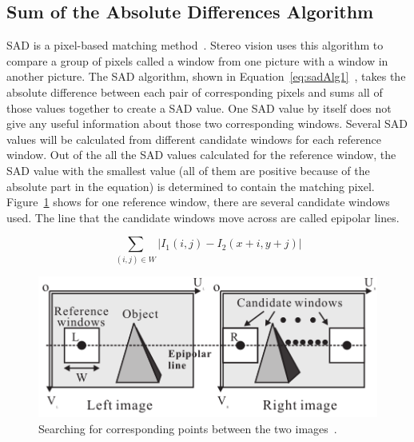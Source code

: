 \subsection{Sum of the Absolute Differences Algorithm}

SAD is a pixel-based matching method~\cite{alteraStratixIVPaper}. Stereo vision uses this algorithm to compare a group of pixels called a window from one picture with a window in another picture. The SAD algorithm, shown in Equation~\ref{eq:sadAlg1}~\cite{alteraStratixIVPaper}, takes the absolute difference between each pair of corresponding pixels and sums all of those values together to create a SAD value. One SAD value by itself does not give any useful information about those two corresponding windows. Several SAD values will be calculated from different candidate windows for each reference window. Out of the all the SAD values calculated for the reference window, the SAD value with the smallest value (all of them are positive because of the absolute part in the equation) is determined to contain the matching pixel. Figure~\ref{fig:sad_corr} shows for one reference window, there are several candidate windows used. The line that the candidate windows move across are called epipolar lines. 

\begin{equation}
	\sum\limits_{(i,j)\in W}\left| I_{1}(i,j)-I_{2}(x+i,y+j) \right|
	\label{eq:sadAlg1}
\end{equation}

\begin{figure}
\begin{center}
	\includegraphics{figures/sadCorrespondingWindows.png}
	\captionfonts
	\caption{Searching for corresponding points between the two images~\cite{sadParallel}.}
	\label{fig:sad_corr}
\end{center}
\end{figure}

